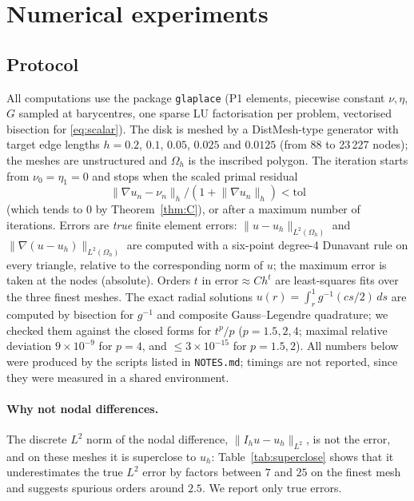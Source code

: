 \documentclass[11pt]{amsart}
\theoremstyle{definition}
\theoremstyle{remark}
\numberwithin{equation}{section}
\newcommand{\norm}[1]{\lVert #1\rVert}
\begin{document}
\section{Numerical experiments}\label{sec:numerics}

\subsection{Protocol}\label{ssec:protocol}
All computations use the package \texttt{glaplace} (P1 elements, piecewise constant $\nu,\eta$, $G$ sampled at barycentres, one sparse LU factorisation per problem, vectorised bisection for \eqref{eq:scalar}). The disk is meshed by a DistMesh-type generator with target edge lengths $h=0.2$, $0.1$, $0.05$, $0.025$ and $0.0125$ (from 88 to 23\,227 nodes); the meshes are unstructured and $\Omega_h$ is the inscribed polygon. The iteration starts from $\nu_0=\eta_1=0$ and stops when the scaled primal residual
\[
\norm{\nabla u_n-\nu_n}_h/(1+\norm{\nabla u_n}_h)<\mathrm{tol}
\]
(which tends to $0$ by Theorem~\ref{thm:C}), or after a maximum number of iterations. Errors are \emph{true} finite element errors: $\norm{u-u_h}_{L^2(\Omega_h)}$ and $\norm{\nabla(u-u_h)}_{L^2(\Omega_h)}$ are computed with a six-point degree-4 Dunavant rule on every triangle, relative to the corresponding norm of $u$; the maximum error is taken at the nodes (absolute). Orders $t$ in $\text{error}\approx Ch^t$ are least-squares fits over the three finest meshes. The exact radial solutions $u(r)=\int_r^1g^{-1}(cs/2)\,ds$ are computed by bisection for $g^{-1}$ and composite Gauss--Legendre quadrature; we checked them against the closed forms for $t^p/p$ ($p=1.5,2,4$; maximal relative deviation $9\times10^{-9}$ for $p=4$, and $\le3\times10^{-15}$ for $p=1.5,2$). All numbers below were produced by the scripts listed in \texttt{NOTES.md}; timings are not reported, since they were measured in a shared environment.

\paragraph{Why not nodal differences.} The discrete $L^2$ norm of the nodal difference, $\norm{I_hu-u_h}_{L^2}$, is not the error, and on these meshes it is superclose to $u_h$: Table~\ref{tab:superclose} shows that it underestimates the true $L^2$ error by factors between $7$ and $25$ on the finest mesh and suggests spurious orders around $2.5$. We report only true errors.
\end{document}
